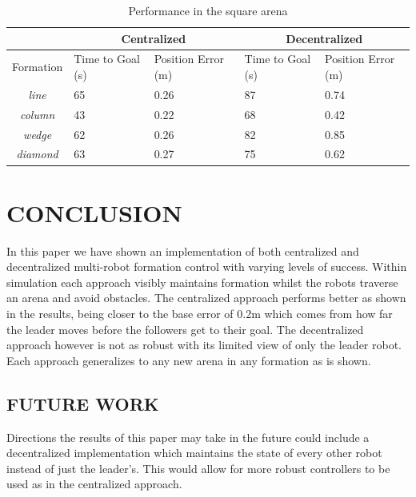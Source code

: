 \documentclass[letterpaper, 10 pt, conference]{ieeeconf}  %
\begin{document}
\begin{table}[tb]
\caption{Performance in the square arena}
\label{tab:results_square}
\begin{tabular}{|c|p{1cm}p{1.2cm}|p{1cm}p{1.2cm}|}
\hline
 & \multicolumn{2}{|c|}{Centralized} & \multicolumn{2}{|c|}{Decentralized} \\
\hline
Formation & Time to Goal (s) & Position Error (m) & Time to Goal (s) & Position Error (m) \\
\hline
\textit{line}        & 65                     & 0.26               & 87                     & 0.74 \\
\textit{column}   & 43                     & 0.22               & 68                     & 0.42 \\
\textit{wedge}    & 62                     & 0.26               & 82                     & 0.85 \\
\textit{diamond} & 63                     & 0.27               & 75                     & 0.62 \\
\hline
\end{tabular}
\end{table}

\section{CONCLUSION}

In this paper we have shown an implementation of both centralized and decentralized multi-robot formation control with varying levels of success. Within simulation each approach visibly maintains formation whilst the robots traverse an arena and avoid obstacles. The centralized approach performs better as shown in the results, being closer to the base error of $0.2$m which comes from how far the leader moves before the followers get to their goal. The decentralized approach however is not as robust with its limited view of only the leader robot. Each approach generalizes to any new arena in any formation as is shown.

\subsection{FUTURE WORK}

Directions the results of this paper may take in the future could include a decentralized implementation which maintains the state of every other robot instead of just the leader's. This would allow for more robust controllers to be used as in the centralized approach.
\end{document}
